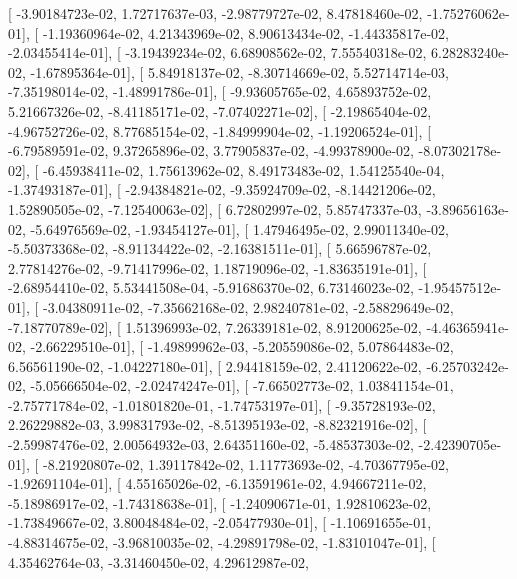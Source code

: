 \documentclass{article}
\begin{document}
       [ -3.90184723e-02,   1.72717637e-03,  -2.98779727e-02,
          8.47818460e-02,  -1.75276062e-01],
       [ -1.19360964e-02,   4.21343969e-02,   8.90613434e-02,
         -1.44335817e-02,  -2.03455414e-01],
       [ -3.19439234e-02,   6.68908562e-02,   7.55540318e-02,
          6.28283240e-02,  -1.67895364e-01],
       [  5.84918137e-02,  -8.30714669e-02,   5.52714714e-03,
         -7.35198014e-02,  -1.48991786e-01],
       [ -9.93605765e-02,   4.65893752e-02,   5.21667326e-02,
         -8.41185171e-02,  -7.07402271e-02],
       [ -2.19865404e-02,  -4.96752726e-02,   8.77685154e-02,
         -1.84999904e-02,  -1.19206524e-01],
       [ -6.79589591e-02,   9.37265896e-02,   3.77905837e-02,
         -4.99378900e-02,  -8.07302178e-02],
       [ -6.45938411e-02,   1.75613962e-02,   8.49173483e-02,
          1.54125540e-04,  -1.37493187e-01],
       [ -2.94384821e-02,  -9.35924709e-02,  -8.14421206e-02,
          1.52890505e-02,  -7.12540063e-02],
       [  6.72802997e-02,   5.85747337e-03,  -3.89656163e-02,
         -5.64976569e-02,  -1.93454127e-01],
       [  1.47946495e-02,   2.99011340e-02,  -5.50373368e-02,
         -8.91134422e-02,  -2.16381511e-01],
       [  5.66596787e-02,   2.77814276e-02,  -9.71417996e-02,
          1.18719096e-02,  -1.83635191e-01],
       [ -2.68954410e-02,   5.53441508e-04,  -5.91686370e-02,
          6.73146023e-02,  -1.95457512e-01],
       [ -3.04380911e-02,  -7.35662168e-02,   2.98240781e-02,
         -2.58829649e-02,  -7.18770789e-02],
       [  1.51396993e-02,   7.26339181e-02,   8.91200625e-02,
         -4.46365941e-02,  -2.66229510e-01],
       [ -1.49899962e-03,  -5.20559086e-02,   5.07864483e-02,
          6.56561190e-02,  -1.04227180e-01],
       [  2.94418159e-02,   2.41120622e-02,  -6.25703242e-02,
         -5.05666504e-02,  -2.02474247e-01],
       [ -7.66502773e-02,   1.03841154e-01,  -2.75771784e-02,
         -1.01801820e-01,  -1.74753197e-01],
       [ -9.35728193e-02,   2.26229882e-03,   3.99831793e-02,
         -8.51395193e-02,  -8.82321916e-02],
       [ -2.59987476e-02,   2.00564932e-03,   2.64351160e-02,
         -5.48537303e-02,  -2.42390705e-01],
       [ -8.21920807e-02,   1.39117842e-02,   1.11773693e-02,
         -4.70367795e-02,  -1.92691104e-01],
       [  4.55165026e-02,  -6.13591961e-02,   4.94667211e-02,
         -5.18986917e-02,  -1.74318638e-01],
       [ -1.24090671e-01,   1.92810623e-02,  -1.73849667e-02,
          3.80048484e-02,  -2.05477930e-01],
       [ -1.10691655e-01,  -4.88314675e-02,  -3.96810035e-02,
         -4.29891798e-02,  -1.83101047e-01],
       [  4.35462764e-03,  -3.31460450e-02,   4.29612987e-02,
\end{document}
